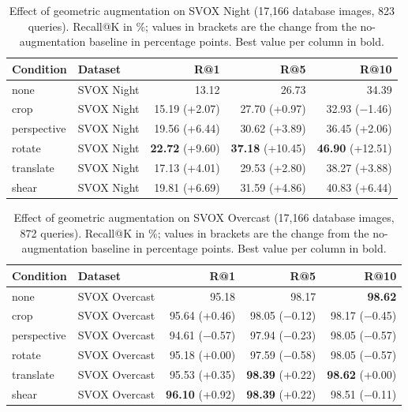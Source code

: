 \begin{table}[htbp]
\centering
\caption{Effect of geometric augmentation on SVOX Night (17,166 database images, 823 queries). Recall@K in \%; values in brackets are the change from the no-augmentation baseline in percentage points. Best value per column in bold.}
\label{tab:geoaug_svox_night}
\begin{tabular}{llrrr}
\toprule
Condition & Dataset & R@1 & R@5 & R@10 \\
\midrule
none & SVOX Night & 13.12 & 26.73 & 34.39 \\
\midrule
crop & SVOX Night & 15.19 {\scriptsize (+2.07)} & 27.70 {\scriptsize (+0.97)} & 32.93 {\scriptsize ($-$1.46)} \\
perspective & SVOX Night & 19.56 {\scriptsize (+6.44)} & 30.62 {\scriptsize (+3.89)} & 36.45 {\scriptsize (+2.06)} \\
rotate & SVOX Night & \textbf{22.72} {\scriptsize (+9.60)} & \textbf{37.18} {\scriptsize (+10.45)} & \textbf{46.90} {\scriptsize (+12.51)} \\
translate & SVOX Night & 17.13 {\scriptsize (+4.01)} & 29.53 {\scriptsize (+2.80)} & 38.27 {\scriptsize (+3.88)} \\
shear & SVOX Night & 19.81 {\scriptsize (+6.69)} & 31.59 {\scriptsize (+4.86)} & 40.83 {\scriptsize (+6.44)} \\
\bottomrule
\end{tabular}
\end{table}

\begin{table}[htbp]
\centering
\caption{Effect of geometric augmentation on SVOX Overcast (17,166 database images, 872 queries). Recall@K in \%; values in brackets are the change from the no-augmentation baseline in percentage points. Best value per column in bold.}
\label{tab:geoaug_svox_overcast}
\begin{tabular}{llrrr}
\toprule
Condition & Dataset & R@1 & R@5 & R@10 \\
\midrule
none & SVOX Overcast & 95.18 & 98.17 & \textbf{98.62} \\
\midrule
crop & SVOX Overcast & 95.64 {\scriptsize (+0.46)} & 98.05 {\scriptsize ($-$0.12)} & 98.17 {\scriptsize ($-$0.45)} \\
perspective & SVOX Overcast & 94.61 {\scriptsize ($-$0.57)} & 97.94 {\scriptsize ($-$0.23)} & 98.05 {\scriptsize ($-$0.57)} \\
rotate & SVOX Overcast & 95.18 {\scriptsize (+0.00)} & 97.59 {\scriptsize ($-$0.58)} & 98.05 {\scriptsize ($-$0.57)} \\
translate & SVOX Overcast & 95.53 {\scriptsize (+0.35)} & \textbf{98.39} {\scriptsize (+0.22)} & \textbf{98.62} {\scriptsize (+0.00)} \\
shear & SVOX Overcast & \textbf{96.10} {\scriptsize (+0.92)} & \textbf{98.39} {\scriptsize (+0.22)} & 98.51 {\scriptsize ($-$0.11)} \\
\bottomrule
\end{tabular}
\end{table}

